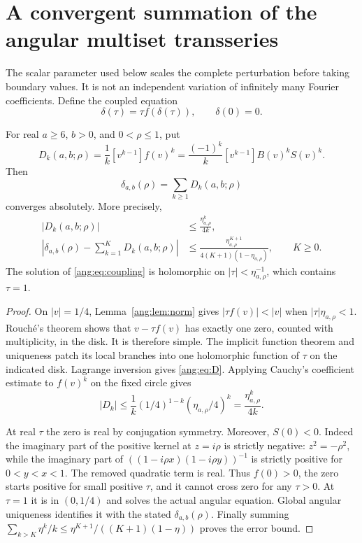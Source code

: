 \section{A convergent summation of the angular multiset transseries}
\label{ang:sec:summation}

The scalar parameter used below scales the complete perturbation
before taking boundary values. It is not an independent variation of
infinitely many Fourier coefficients. Define the coupled equation
\begin{equation}
 \delta(\tau)=\tau f(\delta(\tau)),\qquad \delta(0)=0.
 \label{ang:eq:coupling}
\end{equation}

\begin{theorem}
\label{ang:thm:sum}
For real $a\ge6$, $b>0$, and $0<\rho\le1$, put
\begin{equation}
 D_k(a,b;\rho)=\frac1k[v^{k-1}]f(v)^k
 =\frac{(-1)^k}{k}[v^{k-1}]B(v)^kS(v)^k.
 \label{ang:eq:D}
\end{equation}
Then
\begin{equation}
 \delta_{a,b}(\rho)=\sum_{k\ge1}D_k(a,b;\rho)
 \label{ang:eq:sum}
\end{equation}
converges absolutely. More precisely,
\begin{align}
 |D_k(a,b;\rho)|&\le\frac{\eta_{a,\rho}^k}{4k},
 \label{ang:eq:D-bound}\\
 \left|\delta_{a,b}(\rho)-\sum_{k=1}^KD_k(a,b;\rho)\right|
 &\le\frac{\eta_{a,\rho}^{K+1}}
 {4(K+1)(1-\eta_{a,\rho})},\qquad K\ge0.
 \label{ang:eq:sum-error}
\end{align}
The solution of \eqref{ang:eq:coupling} is holomorphic on
$|\tau|<\eta_{a,\rho}^{-1}$, which contains $\tau=1$.
\end{theorem}
\begin{proof}
On $|v|=1/4$, Lemma~\ref{ang:lem:norm} gives
$|\tau f(v)|<|v|$ when $|\tau|\eta_{a,\rho}<1$.
Rouch\'e's theorem shows that $v-\tau f(v)$ has exactly one
zero, counted with multiplicity, in the disk. It is therefore simple.
The implicit function theorem and uniqueness patch its local branches
into one holomorphic function of $\tau$ on the indicated disk.
Lagrange inversion gives \eqref{ang:eq:D}.
Applying Cauchy's coefficient estimate to $f(v)^k$ on the fixed
circle gives
\[
 |D_k|\le\frac1k(1/4)^{1-k}
              (\eta_{a,\rho}/4)^k
 =\frac{\eta_{a,\rho}^k}{4k}.
\]

At real $\tau$ the zero is real by conjugation symmetry. Moreover,
$S(0)<0$. Indeed the imaginary part of the positive kernel at
$z=i\rho$ is strictly negative: $z^2=-\rho^2$, while
the imaginary part of $((1-i\rho x)(1-i\rho y))^{-1}$ is
strictly positive for $0<y<x<1$. The removed quadratic term is
real. Thus $f(0)>0$, the zero starts positive for small positive
$\tau$, and it cannot cross zero for any $\tau>0$.
At $\tau=1$ it is in $(0,1/4)$ and solves the actual angular
equation. Global angular uniqueness identifies it with the stated
$\delta_{a,b}(\rho)$. Finally summing
$\sum_{k>K}\eta^k/k\le\eta^{K+1}/((K+1)(1-\eta))$
proves the error bound.
\end{proof}

